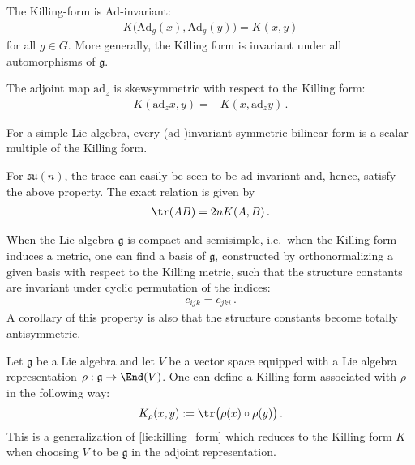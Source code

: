     \begin{property}
        The Killing-form is $\mathrm{Ad}$-invariant:
        \begin{gather}
            K\bigl(\mathrm{Ad}_g(x),\mathrm{Ad}_g(y)\bigr) = K(x,y)
        \end{gather}
        for all $g\in G$. More generally, the Killing form is invariant under all automorphisms of $\mathfrak{g}$.
    \end{property}
    \begin{result}\label{lie:ad_killing_form}
        The adjoint map $\mathrm{ad}_z$ is skewsymmetric with respect to the Killing form:
        \begin{gather}
            K(\mathrm{ad}_zx,y) = -K(x,\mathrm{ad}_zy)\,.
        \end{gather}
    \end{result}

    \begin{property}\label{lie:killing_trace}
        For a simple Lie algebra, every ($\mathrm{ad}$-)invariant symmetric bilinear form is a scalar multiple of the Killing form.
    \end{property}
    \begin{example}
        For $\mathfrak{su}(n)$, the trace can easily be seen to be $\mathrm{ad}$-invariant and, hence, satisfy the above property. The exact relation is given by
        \begin{gather}
            \tr(AB) = 2nK(A,B)\,.
        \end{gather}
    \end{example}

    \begin{property}
        When the Lie algebra $\mathfrak{g}$ is compact and semisimple, i.e.~when the Killing form induces a metric, one can find a basis of $\mathfrak{g}$, constructed by orthonormalizing a given basis with respect to the Killing metric, such that the structure constants are invariant under cyclic permutation of the indices:
        \begin{gather}
            c_{ijk} = c_{jki}\,.
        \end{gather}
        A corollary of this property is also that the structure constants become totally antisymmetric.
    \end{property}

    \begin{construct}\label{lie:rho_killing_form}
        Let $\mathfrak{g}$ be a Lie algebra and let $V$ be a vector space equipped with a Lie algebra representation $\rho:\mathfrak{g}\rightarrow\End(V)$. One can define a Killing form associated with $\rho$ in the following way:
        \begin{gather}
            K_\rho(x,y) := \tr\bigl(\rho(x)\circ\rho(y)\bigr)\,.
        \end{gather}
        This is a generalization of \cref{lie:killing_form} which reduces to the Killing form $K$ when choosing $V$ to be $\mathfrak{g}$ in the adjoint representation.
    \end{construct}


